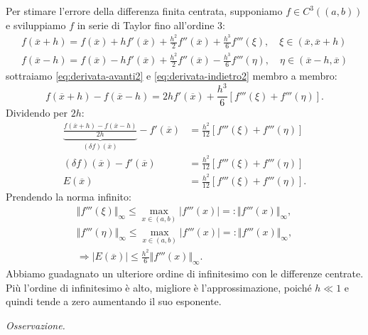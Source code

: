 Per stimare l'errore della differenza finita centrata, supponiamo $f\in C^{3}(( a,b))$ e sviluppiamo $f$ in serie di Taylor fino all'ordine 3:
\begin{gather}
f(\overline{x} +h) =f(\overline{x}) +hf'(\overline{x}) +\frac{h^{2}}{2} f''(\overline{x}) +\frac{h^{3}}{6} f'''( \xi ) ,\quad \xi \in (\overline{x} ,\overline{x} +h) \label{eq:derivata-avanti2}\\
f(\overline{x} -h) =f(\overline{x}) -hf'(\overline{x}) +\frac{h^{2}}{2} f''(\overline{x}) -\frac{h^{3}}{6} f'''( \eta ) ,\quad \eta \in (\overline{x} -h,\overline{x}) \label{eq:derivata-indietro2}
\end{gather}
sottraiamo \eqref{eq:derivata-avanti2} e \eqref{eq:derivata-indietro2} membro a membro:
\begin{equation*}
f(\overline{x} +h) -f(\overline{x} -h) =2hf'(\overline{x}) +\frac{h^{3}}{6}[ f'''( \xi ) +f'''( \eta )].
\end{equation*}
Dividendo per $2h$:
\begin{align*}
\underbrace{\frac{f(\overline{x} +h) -f(\overline{x} -h)}{2h}}_{( \delta f)(\overline{x})} -f'(\overline{x}) & =\frac{h^{2}}{12}[ f'''( \xi ) +f'''( \eta )]\\
( \delta f)(\overline{x}) -f'(\overline{x}) & =\frac{h^{2}}{12}[ f'''( \xi ) +f'''( \eta )]\\
E(\overline{x}) & =\frac{h^{2}}{12}[ f'''( \xi ) +f'''( \eta )].
\end{align*}
Prendendo la norma infinito:
\begin{gather*}
\Vert f'''( \xi )\Vert _{\infty } \leqslant \max_{x\in ( a,b)}| f'''(x)| =:\Vert f'''(x)\Vert _{\infty } ,\\
\Vert f'''( \eta )\Vert _{\infty } \leqslant \max_{x\in ( a,b)}| f'''(x)| =:\Vert f'''(x)\Vert _{\infty } ,\\
\Rightarrow | E(\overline{x})| \leqslant \frac{h^{2}}{6}\Vert f'''(x)\Vert _{\infty } .
\end{gather*}
Abbiamo guadagnato un ulteriore ordine di infinitesimo con le differenze centrate.
Più l'ordine di infinitesimo è alto, migliore è l'approssimazione, poiché $h \ll 1$ e quindi tende a zero aumentando il suo esponente.

\textit{Osservazione.}

